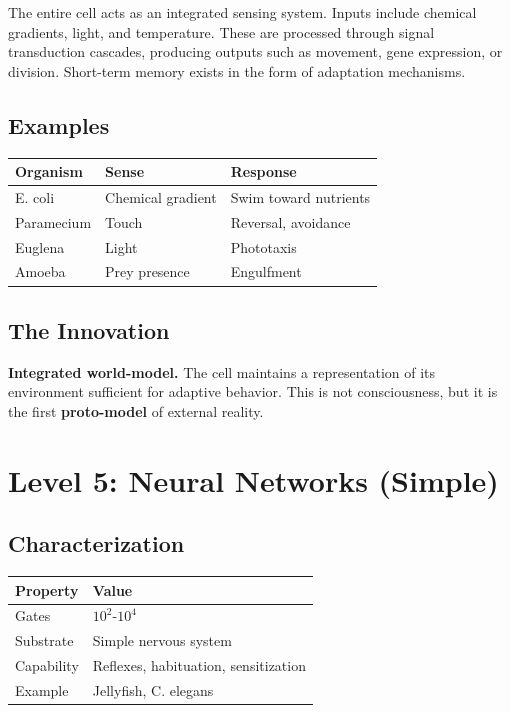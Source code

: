 \documentclass[
  11pt,
  letterpaper,
  twoside,
  openright]{book}
\begin{document}
The entire cell acts as an integrated sensing system. Inputs include
chemical gradients, light, and temperature. These are processed through
signal transduction cascades, producing outputs such as movement, gene
expression, or division. Short-term memory exists in the form of
adaptation mechanisms.

\subsection{Examples}\label{examples-6}

\begin{longtable}[]{@{}lll@{}}
\toprule\noalign{}
Organism & Sense & Response \\
\midrule\noalign{}
\endhead
\bottomrule\noalign{}
\endlastfoot
E. coli & Chemical gradient & Swim toward nutrients \\
Paramecium & Touch & Reversal, avoidance \\
Euglena & Light & Phototaxis \\
Amoeba & Prey presence & Engulfment \\
\end{longtable}

\subsection{The Innovation}\label{the-innovation-2}

\textbf{Integrated world-model.} The cell maintains a representation of
its environment sufficient for adaptive behavior. This is not
consciousness, but it is the first \textbf{proto-model} of external
reality.

\section{Level 5: Neural Networks
(Simple)}\label{level-5-neural-networks-simple}

\subsection{Characterization}\label{characterization-5}

\begin{longtable}[]{@{}ll@{}}
\toprule\noalign{}
Property & Value \\
\midrule\noalign{}
\endhead
\bottomrule\noalign{}
\endlastfoot
Gates & \(10^2\)-\(10^4\) \\
Substrate & Simple nervous system \\
Capability & Reflexes, habituation, sensitization \\
Example & Jellyfish, C. elegans \\
\end{longtable}
\end{document}
